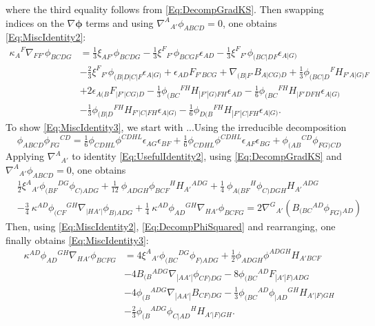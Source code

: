 \documentclass[10pt,a4paper]{article}
\theoremstyle{plain}
\begin{document}
where the third equality follows from \eqref{Eq:DecompGradKS}. Then swapping indices on the $\nabla\bm\phi$ terms and using $\nabla^A{}_{A'}\phi_{ABCD}=0$, one obtains \eqref{Eq:MiscIdentity2}:
\begin{align*}
    \kappa_{A}{}^{F} \nabla_{FF'}\phi_{BCDG} &= \tfrac{1}{3} \xi_{AF'}
    \phi_{BCDG} - \tfrac{1}{3} \xi^{F}{}_{F'} \phi_{BCGF}
    \epsilon_{AD} - \tfrac{1}{3}
    \xi^{F}{}_{F'}\phi_{(BC|DF}\epsilon_{A|G)} \nonumber \\ & -
    \tfrac{2}{3} \xi^{F}{}_{F'}\phi_{(B|D|C|F}\epsilon_{A|G)} +
    \epsilon_{AD} F_{F'BCG} + \nabla_{(B|F'}B_{A|CG)D} + \tfrac{1}{3}
    \phi_{(BC|D}{}^{F}H_{F'A|G)F} \nonumber \\& + 2
    \epsilon_{A(B}F_{|F'\vert CG)D} - \tfrac{1}{3}
    \phi_{(BC}{}^{FH}H_{|F'|G)FH}\epsilon_{AD} - \tfrac{1}{6}
    \phi_{(BC}{}^{FH}H_{|F'DFH}\epsilon_{A|G)} \nonumber\\ & -
    \tfrac{1}{3} \phi_{(B|D}{}^{FH}H_{F'|C|FH}\epsilon_{A|G)} -
    \tfrac{1}{6}
    \phi_{D(B}{}^{FH}H_{|F'|C|FH}\epsilon_{A|G)}.
\end{align*}
To show \eqref{Eq:MiscIdentity3}, we start with ...Using the irreducible decomposition
\begin{equation}
\phi_{ABCD} \phi_{FG}{}^{CD} = \tfrac{1}{6} \phi_{CDHL} \phi^{CDHL}
\epsilon_{AG} \epsilon_{BF} + \tfrac{1}{6} \phi_{CDHL} \phi^{CDHL}
\epsilon_{AF} \epsilon_{BG} +
\phi_{(AB}{}^{CD}\phi_{FG)CD} \label{Eq:DecompPhiSquared}
\end{equation}
Applying $\nabla^A{}_{A'}$ to identity \eqref{Eq:UsefulIdentity2}, using \eqref{Eq:DecompGradKS} and $\nabla^A{}_{A'}\phi_{ABCD}=0$, one obtains
\begin{align*}
&\tfrac{1}{2} \xi^{A}{}_{A'} \phi_{(BF}{}^{DG} \phi_{C)ADG} + \tfrac{1}{12} \
\phi_{ADGH} \phi_{BCF}{}^{H} H_{A'}{}^{ADG} + \tfrac{1}{4} \
\phi_{A(BF}{}^{H} \phi_{C)DGH} H_{A'}{}^{ADG}  \\
&-  \tfrac{3}{4} \
\kappa^{AD} \phi_{(CF}{}^{GH} \nabla_{\vert HA'\vert}\phi_{B)ADG} + \tfrac{1}{4} \
\kappa^{AD} \phi_{AD}{}^{GH} \nabla_{HA'}\phi_{BCFG} = 2 \nabla^G{}_{A'}(B_{(BC}{}^{AD} \phi_{FG)}{}_{AD})	
\end{align*}
Then, using \eqref{Eq:MiscIdentity2}, \eqref{Eq:DecompPhiSquared} and rearranging, one finally obtains \eqref{Eq:MiscIdentity3}: 
\begin{align*}
    \kappa^{AD} \phi_{AD}{}^{GH} \nabla_{HA'}\phi_{BCFG} &= 4
    \xi^{A}{}_{A'}\phi_{(BC}{}^{DG}\phi_{F)ADG} + \tfrac{1}{2}
    \phi_{ADGH} \phi^{ADGH} H_{A'BCF} \nonumber\\ & - 4
    B_{(B}{}^{ADG}\nabla_{|AA'|}\phi_{CF)DG} - 8
    \phi_{(BC}{}^{AD}F_{|A'|F)ADG}\nonumber \\ & - 4
    \phi_{(B}{}^{ADG}\nabla_{|AA'|}B_{CF)DG} - \tfrac{1}{3}
    \phi_{(BC}{}^{AD}\phi_{|AD}{}^{GH}H_{A'|F)GH}\nonumber \\ & -
    \tfrac{2}{3}
    \phi_{(B}{}^{ADG}\phi_{C|AD}{}^{H}H_{A'|F)GH}. \label{Eq:MiscIdentity3}
\end{align*}
\end{document}
